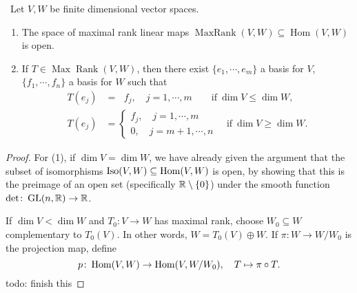 \begin{lemma}\,
    Let $V,W$ be finite dimensional vector spaces.
    \begin{enumerate}[label=(\roman*)]
        \item The space of maximal rank linear maps $\operatorname{MaxRank}(V,W) \subseteq \operatorname{Hom}(V,W)$ is open.
        \item If $T \in \operatorname{Max} \operatorname{Rank}(V,W)$, then there exist $\{e_1,\cdots ,e_m\} $ a basis for $V$, $\{f_1,\cdots ,f_n \} $ a basis for $W$ such that 
            \begin{align*}
                T(e_j )&= \ \ \, f_j , \quad j=1,\cdots ,m \qquad \text{if} \ \dim V \leq \dim W,\\
                T(e_j )&=
                \begin{cases}
                    f_j , \quad j=1,\cdots ,m\\
                    0, \quad j=m+1,\cdots ,n
                \end{cases}\quad \text{if} \ \dim V \geq \dim W.
            \end{align*}
    \end{enumerate}
\end{lemma}
\begin{proof}
    For (1), if $\dim V=\dim W$, we have already given the argument that the subset of isomorphisms $\operatorname{Iso}(V,W) \subseteq \operatorname{Hom}(V,W)$ is open, by showing that this is the preimage of an open set (specifically $\mathbb{R}\setminus \{0\} $) under the smooth function $\det \colon \operatorname{GL}(n,\mathbb{R}) \to \mathbb{R}$.

    If $\dim V <\dim W$ and $T_0 \colon V \to W$ has maximal rank, choose $W_0 \subseteq W$ complementary to $T_0(V)$. In other words, $W= T_0(V) \oplus W$. If $\pi \colon W \to W /W_0$ is the projection map, define \[
        p \colon \operatorname{Hom}(V,W) \to \operatorname{Hom} (V,W /W_0), \quad T \mapsto \pi \circ T.
    \] {\color{red}todo: finish this} 
\end{proof}

